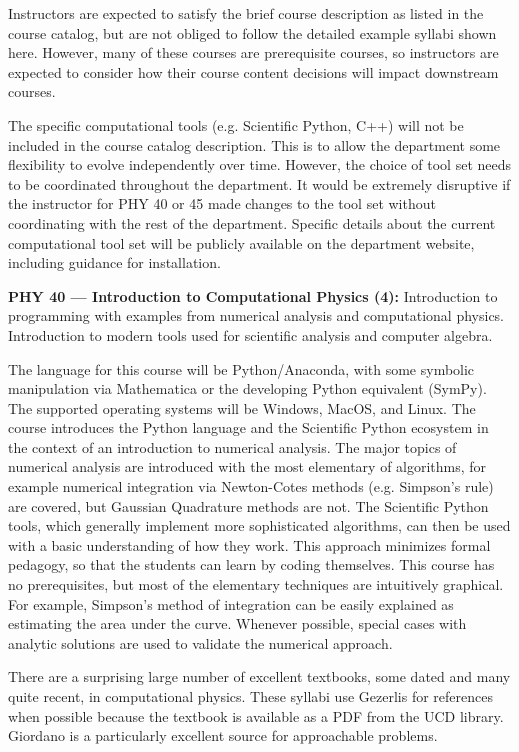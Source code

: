 \documentclass[12pt]{article}
\begin{document}
Instructors are expected to satisfy the brief course description as
listed in the course catalog, but are not obliged to follow the
detailed example syllabi shown here.  However, many of these courses
are prerequisite courses, so instructors are expected to consider how
their course content decisions will impact downstream courses.

The specific computational tools (e.g. Scientific Python, C++) will
not be included in the course catalog description.  This is to allow
the department some flexibility to evolve independently over time.
However, the choice of tool set needs to be coordinated throughout the
department.  It would be extremely disruptive if the instructor for
PHY 40 or 45 made changes to the tool set without coordinating with
the rest of the department.  Specific details about the current
computational tool set will be publicly available on the department
website, including guidance for installation.

\vskip 1cm
\noindent
{\bf PHY 40 --- Introduction to Computational Physics (4):}
Introduction to programming with examples from numerical analysis and
computational physics. Introduction to modern tools used for
scientific analysis and computer algebra.

The language for this course will be Python/Anaconda, with some
symbolic manipulation via Mathematica or the developing Python
equivalent (SymPy).  The supported operating systems will be Windows,
MacOS, and Linux.  The course introduces the Python language and the
Scientific Python ecosystem in the context of an introduction to
numerical analysis.  The major topics of numerical analysis are
introduced with the most elementary of algorithms, for example
numerical integration via Newton-Cotes methods (e.g. Simpson's rule)
are covered, but Gaussian Quadrature methods are not.  The Scientific
Python tools, which generally implement more sophisticated algorithms,
can then be used with a basic understanding of how they work.  This
approach minimizes formal pedagogy, so that the students can learn by
coding themselves.  This course has no prerequisites, but most of the
elementary techniques are intuitively graphical.  For example,
Simpson's method of integration can be easily explained as estimating
the area under the curve.  Whenever possible, special cases with
analytic solutions are used to validate the numerical approach.

There are a surprising large number of excellent textbooks, some dated
and many quite recent, in computational physics.  These syllabi use
Gezerlis for references when possible because the textbook is
available as a PDF from the UCD library.  Giordano is a particularly
excellent source for approachable problems.
\end{document}
